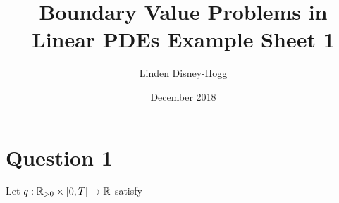 \documentclass{article}
\title{Boundary Value Problems in Linear PDEs Example Sheet 1}
\author{Linden Disney-Hogg}
\date{December 2018}
\begin{document}
\maketitle
\tableofcontents

\section{Question 1}

Let $q:\mathbb{R}_{>0} \times [0,T] \to \mathbb{R}$ satisfy 
\end{document}
